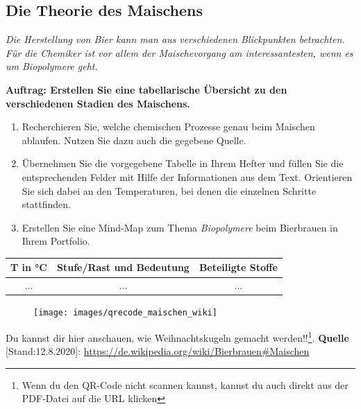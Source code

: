 \documentclass{scrartcl}  %
\begin{document}
		\subsection{Die Theorie des Maischens}
		
			\textit{Die Herstellung von Bier kann man aus verschiedenen Blickpunkten betrachten. Für die Chemiker ist vor allem der Maischevorgang am interessantesten, wenn es um Biopolymere geht.} \newline

			\noindent \textbf{Auftrag: Erstellen Sie eine tabellarische Übersicht zu den verschiedenen Stadien des	 Maischens.}
			\begin{enumerate}
				\item Recherchieren Sie, welche chemischen Prozesse genau beim Maischen ablaufen. Nutzen Sie dazu auch die gegebene Quelle.
				\item Übernehmen Sie die vorgegebene Tabelle in Ihrem Hefter und füllen Sie die entsprechenden Felder mit Hilfe der Informationen aus dem Text. Orientieren Sie sich dabei an den Temperaturen, bei denen die einzelnen Schritte stattfinden.
				\item Erstellen Sie eine Mind-Map zum Thema \textit{Biopolymere} beim Bierbrauen in Ihrem Portfolio.
			\end{enumerate}
			
			\begin{center}
				\begin{tabular}{|c|c|c|}
					\hline
					T in °C & Stufe/Rast und Bedeutung & Beteiligte Stoffe \\
					\hline
					... & ... & ... \\
					\hline
				\end{tabular}
			\end{center}
			
\vspace{0.3cm}
			\begin{tcolorbox}[enhanced,
				colback=white,
				colframe=black,
				fonttitle=\sffamily\bfseries\large, 
				title=Internet-Quelle (URL),  %
				attach boxed title to top left={xshift=3.2mm,yshift=-0.50mm},
				boxed title style={skin=enhancedfirst jigsaw,size=small,arc=1mm,bottom=-1mm,colframe=black,height=0.75cm},
				colbacktitle=black,
				drop lifted shadow]
				\begin{figure}  
					\centering
					\vspace{-14pt}  %
					\texttt{[image: images/qrecode\_maischen\_wiki]}
				\end{figure}
				
					Du kannst dir hier anschauen, wie Weihnachtskugeln gemacht werden!!\footnote{Wenn du den QR-Code nicht scannen kannst, kannst du auch direkt aus der PDF-Datei auf die URL klicken}. \newline
					\textbf{Quelle} [Stand:12.8.2020]: \newline 
					\url{https://de.wikipedia.org/wiki/Bierbrauen#Maischen}
				\vspace{1.0cm}  %
			\end{tcolorbox}
\end{document}
